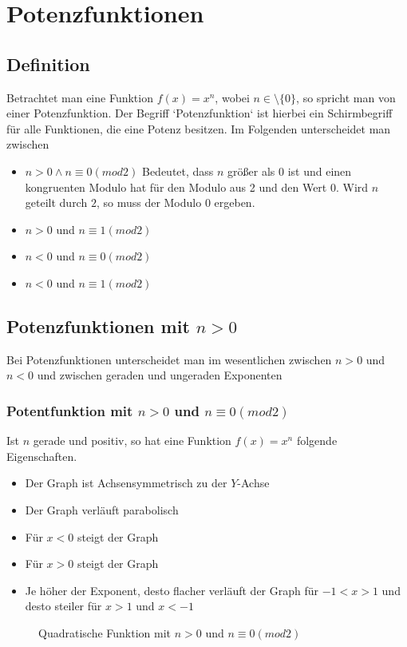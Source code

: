 \section{Potenzfunktionen}\label{sec:Potenzfunktionen}
\subsection{Definition}\label{sec:Potenzfunktionen/Definition}
Betrachtet man eine Funktion $f(x)=x^n$, wobei $n\in\setminus\{0\}$, so spricht man von einer Potenzfunktion. Der Begriff `{}Potenzfunktion`{} ist hierbei ein Schirmbegriff für alle Funktionen, die eine Potenz besitzen. Im Folgenden unterscheidet man zwischen
\begin{itemize}
	\item $n>0 \land n\equiv0(mod2)$ Bedeutet, dass $n$ größer als 0 ist und einen kongruenten Modulo hat für den Modulo aus 2 und den Wert $0$. Wird $n$ geteilt durch $2$, so muss der Modulo $0$ ergeben.
	\item $n>0$ und $ n\equiv1(mod2)$
	\item $n<0$ und $ n\equiv0(mod2)$
	\item $n<0$ und $ n\equiv1(mod2)$
\end{itemize}
\subsection{Potenzfunktionen mit $n>0$}\label{sec:Potenzfunktionen/Potenzfunktionen mit positivem Exponenten}
Bei Potenzfunktionen unterscheidet man im wesentlichen zwischen $n>0$ und $n<0$ und zwischen geraden und ungeraden Exponenten
\subsubsection{Potentfunktion mit $n>0 $ und $ n\equiv0(mod2)$}
Ist $n$ gerade und positiv, so hat eine Funktion $f(x)=x	^n$ folgende Eigenschaften.
\begin{itemize}
	\item Der Graph ist Achsensymmetrisch zu der $Y$-Achse
	\item Der Graph verläuft parabolisch
	\item Für $x<0$ steigt der Graph
	\item Für $x>0$ steigt der Graph
	\item Je höher der Exponent, desto flacher verläuft der Graph für $-1<x>1$ und desto steiler für $x>1$ und $x<-1$
\end{itemize}
\begin{figure}[h!]
\centering
{}
\caption{Quadratische Funktion mit $n>0$ und $ n\equiv0(mod2)$}
\end{figure}
